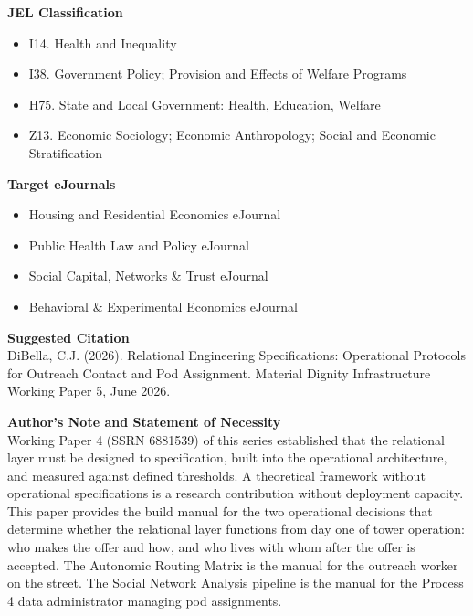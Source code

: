 \documentclass[12pt, letterpaper]{article}
\begin{document}
\vspace{8pt}
\noindent\textbf{JEL Classification}
\begin{itemize}[nosep, before={\vspace{-8pt}}, leftmargin=2em]
    \item I14. Health and Inequality
    \item I38. Government Policy; Provision and Effects of Welfare Programs
    \item H75. State and Local Government: Health, Education, Welfare
    \item Z13. Economic Sociology; Economic Anthropology; Social and Economic Stratification
\end{itemize}

\vspace{8pt}
\noindent\textbf{Target eJournals}
\begin{itemize}[nosep, before={\vspace{-8pt}}, leftmargin=2em]
    \item Housing and Residential Economics eJournal
    \item Public Health Law and Policy eJournal
    \item Social Capital, Networks \& Trust eJournal
    \item Behavioral \& Experimental Economics eJournal
\end{itemize}

\vspace{8pt}
\noindent\textbf{Suggested Citation}\\[1pt]
DiBella, C.J. (2026). Relational Engineering Specifications: Operational Protocols for Outreach Contact and Pod Assignment. Material Dignity Infrastructure Working Paper 5, June 2026.

\newpage

\vspace{8pt}
\noindent\textbf{Author's Note and Statement of Necessity}\\[1pt]
Working Paper 4 (SSRN 6881539) of this series established that the relational layer must be designed to specification, built into the operational architecture, and measured against defined thresholds. A theoretical framework without operational specifications is a research contribution without deployment capacity. This paper provides the build manual for the two operational decisions that determine whether the relational layer functions from day one of tower operation: who makes the offer and how, and who lives with whom after the offer is accepted. The Autonomic Routing Matrix is the manual for the outreach worker on the street. The Social Network Analysis pipeline is the manual for the Process 4 data administrator managing pod assignments.
\end{document}

